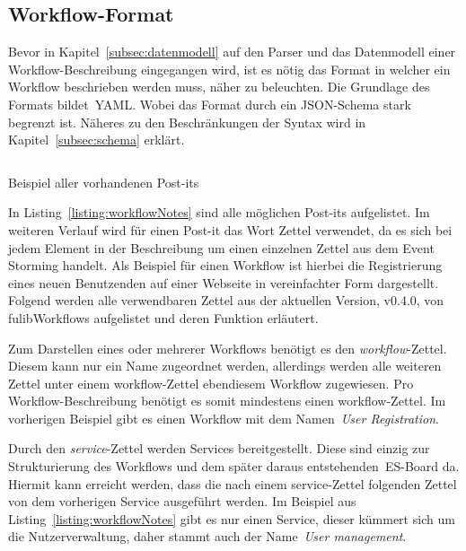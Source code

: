 \subsection{Workflow-Format}\label{subsec:workflow-format}
Bevor in Kapitel~\ref{subsec:datenmodell} auf den Parser und das Datenmodell einer Workflow-Beschreibung eingegangen wird,
ist es nötig das Format in welcher ein Workflow beschrieben werden muss, näher zu beleuchten.
Die Grundlage des Formats bildet~\ac{YAML}.
Wobei das Format durch ein JSON-Schema stark begrenzt ist.
Näheres zu den Beschränkungen der Syntax wird in Kapitel~\ref{subsec:schema} erklärt.

\begin{listing}[!ht]
    \inputminted{yaml}{listings/3.1.1/allNotes.es.yaml}
    \caption{Beispiel aller vorhandenen Post-its\textsuperscript{\textregistered}}
    \label{listing:workflowNotes}
\end{listing}

In Listing~\ref{listing:workflowNotes} sind alle möglichen Post-its\textsuperscript{\textregistered} aufgelistet.
Im weiteren Verlauf wird für einen Post-it\textsuperscript{\textregistered} das Wort Zettel verwendet, da es sich bei jedem Element in der Beschreibung um einen einzelnen Zettel aus dem Event Storming handelt.
Als Beispiel für einen Workflow ist hierbei die Registrierung eines neuen Benutzenden auf einer Webseite in vereinfachter Form dargestellt.
Folgend werden alle verwendbaren Zettel aus der aktuellen Version, v0.4.0, von fulibWorkflows aufgelistet und deren Funktion erläutert.


Zum Darstellen eines oder mehrerer Workflows benötigt es den \textit{workflow}-Zettel.
Diesem kann nur ein Name zugeordnet werden, allerdings werden alle weiteren Zettel unter einem workflow-Zettel ebendiesem Workflow zugewiesen.
Pro Workflow-Beschreibung benötigt es somit mindestens einen workflow-Zettel.
Im vorherigen Beispiel gibt es einen Workflow mit dem Namen~\textit{User Registration}.


Durch den \textit{service}-Zettel werden Services bereitgestellt.
Diese sind einzig zur Strukturierung des Workflows und dem später daraus entstehenden~\ac{ES}-Board da.
Hiermit kann erreicht werden, dass die nach einem service-Zettel folgenden Zettel von dem vorherigen Service ausgeführt werden.
Im Beispiel aus Listing~\ref{listing:workflowNotes} gibt es nur einen Service, dieser kümmert sich um die Nutzerverwaltung, daher
stammt auch der Name~\textit{User management}.

